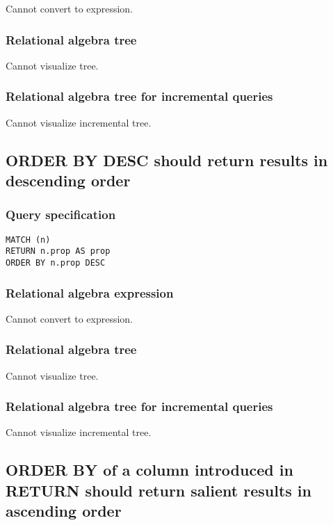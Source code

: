 Cannot convert to expression.

\subsubsection*{Relational algebra tree}

Cannot visualize tree.

\subsubsection*{Relational algebra tree for incremental queries}

Cannot visualize incremental tree.

\subsection{ORDER BY DESC should return results in descending order}

\subsubsection*{Query specification}

\begin{lstlisting}
MATCH (n)
RETURN n.prop AS prop
ORDER BY n.prop DESC
\end{lstlisting}

\subsubsection*{Relational algebra expression}

Cannot convert to expression.

\subsubsection*{Relational algebra tree}

Cannot visualize tree.

\subsubsection*{Relational algebra tree for incremental queries}

Cannot visualize incremental tree.

\subsection{ORDER BY of a column introduced in RETURN should return salient results in ascending order}

